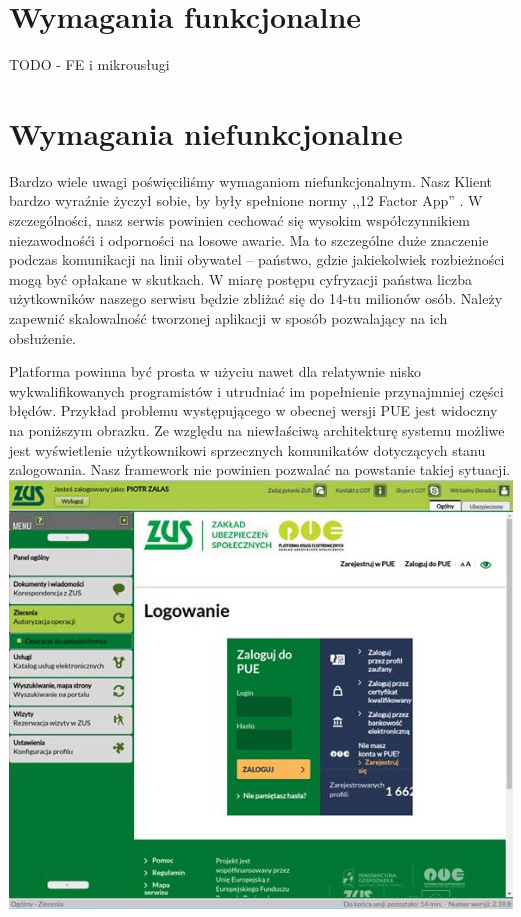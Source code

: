 \documentclass[licencjacka]{pracamgr}
\begin{document}
\section{Wymagania funkcjonalne}

TODO - FE i mikrousługi %

\section{Wymagania niefunkcjonalne}

Bardzo wiele uwagi poświęciliśmy wymaganiom niefunkcjonalnym. Nasz Klient bardzo
wyraźnie życzył sobie, by były spełnione normy ,,12 Factor App'' \cite{tfa}.
W szczególności, nasz serwis powinien cechować się wysokim współczynnikiem
niezawodnośći i odporności na losowe awarie. Ma to szczególne duże znaczenie
podczas komunikacji na linii obywatel -- państwo, gdzie jakiekolwiek rozbieżności
mogą być opłakane w skutkach. W miarę postępu cyfryzacji państwa liczba użytkowników
naszego serwisu będzie zbliżać się do 14-tu milionów osób. Należy zapewnić
skalowalność tworzonej aplikacji w sposób pozwalający na ich obsłużenie.

Platforma powinna być prosta w użyciu nawet dla relatywnie nisko wykwalifikowanych
programistów i utrudniać im popełnienie przynajmniej części błędów. Przykład
problemu występującego w obecnej wersji PUE jest widoczny na poniższym obrazku.
Ze względu na niewłaściwą architekturę systemu możliwe jest wyświetlenie
użytkownikowi sprzecznych komunikatów dotyczących stanu zalogowania. Nasz framework
nie powinien pozwalać na powstanie takiej sytuacji.\\
\includegraphics[width=\textwidth]{obrazki/logowaniezle.jpg}
\end{document}
